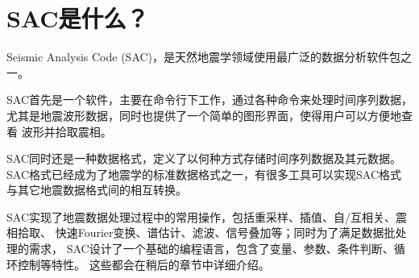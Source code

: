 \section{SAC是什么？}

Seismic Analysis Code (SAC)，是天然地震学领域使用最广泛的数据分析软件包之一。

SAC首先是一个软件，主要在命令行下工作，通过各种命令来处理时间序列数据，
尤其是地震波形数据，同时也提供了一个简单的图形界面，使得用户可以方便地查看
波形并拾取震相。

SAC同时还是一种数据格式，定义了以何种方式存储时间序列数据及其元数据。
SAC格式已经成为了地震学的标准数据格式之一，有很多工具可以实现SAC格式
与其它地震数据格式间的相互转换。

SAC实现了地震数据处理过程中的常用操作，包括重采样、插值、自/互相关、震相拾取、
快速Fourier变换、谱估计、滤波、信号叠加等；同时为了满足数据批处理的需求，
SAC设计了一个基础的编程语言，包含了变量、参数、条件判断、循环控制等特性。
这些都会在稍后的章节中详细介绍。
